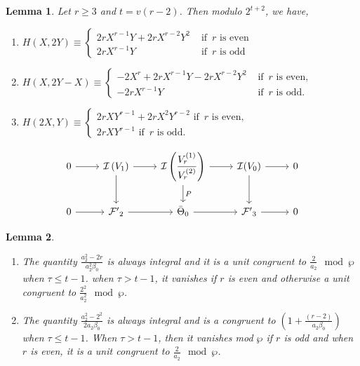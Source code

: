\documentclass[10pt,a4paper]{amsart}
\newtheorem{lemma}{Lemma}
\begin{document}
\begin{lemma}\label{Heven}
Let $r\geq 3$ and $t=v(r-2)$. Then modulo $2^{t+2}$, we have, 
\begin{enumerate}
	\item $H(X,2Y) \equiv 
    \begin{cases}
    2rX^{r-1}Y + 2rX^{r-2}Y^2 &\text{ if }\, r \text{ is even}\\
    2rX^{r-1}Y &\text{ if }\, r \text{ is odd}    
    \end{cases}
    $ \label{Heven1}
	\item $H(X,2Y-X) \equiv \begin{cases}
-2X^{r}+2rX^{r-1}Y-2rX^{r-2}Y^2 & \text{ if }\, r \text{ is even,}\\
 -2rX^{r-1}Y & \text{ if }\, r \text{ is odd.}
    \end{cases}$    
    \label{Heven2}
	\item $H(2X,Y) \equiv \begin{cases}
2rXY^{r-1} + 2rX^2Y^{r-2} \text{ if }\, r \text{ is even,}\\
2rXY^{r-1} \text{ if }\, r \text{ is odd.}
	\end{cases}$ \label{Heven3}
\end{enumerate}
\end{lemma}

\begin{equation}\label{diag4}
\begin{tikzcd}
 		0 \arrow[r] & \mathcal{I}\left(V_{1}\right) \arrow[d, ""]\arrow[r] & \mathcal{I}\left(\dfrac{V_{r}^{(1)}}{V_{r}^{(2)}}\right)  \arrow[r] \arrow[d, "P"] & \mathcal{I}(V_{0}) \arrow [r] \arrow[d, ""]& 0\\
 		0 \arrow[r] &\mathcal{F'}_{2}  \arrow[r] & \bar{\Theta}_{0} \arrow[r] & \mathcal{F'}_{3}\arrow[r] & 0
 \end{tikzcd}
\end{equation}

\begin{lemma}\label{sl1par}  \begin{enumerate}
      \item The quantity $\frac{a_{2}^2-2r}{a_{2}^2\beta_{0}}$ is always integral and 
   it is a unit congruent to $\frac{2}{a_{2}}\mod\wp$ when $\tau\leq t-1$. when $\tau>t-1$, it vanishes if $r$ is even and otherwise a unit congruent to $\frac{2^2}{a_{2}^2}\mod\wp$. \label{sl1par1} 
   \item The quantity $\frac{a_{2}^2-2^2}{2a_{2}\beta_{0}}$ is always integral and is a congruent to $\left(1+\frac{(r-2)}{a_{2}\beta_{0}}\right)$ when $\tau\leq t-1$. When $\tau>t-1$, then it vanishes mod $\wp$ if $r$ is odd and when $r$ is even, it is a unit congruent to $\frac{2}{a_{2}} \mod\wp$.\label{sl1par2} 
   \end{enumerate} 
\end{lemma}
\end{document}
